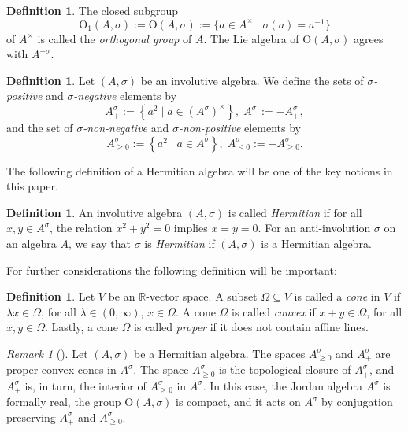 \documentclass[oneside,11pt]{amsart}
\theoremstyle{definition}
\newtheorem{defn}[thm]{Definition}
\theoremstyle{remark}
\newtheorem{rem}[thm]{Remark}
\numberwithin{thm}{section}
\numberwithin{equation}{section}
\begin{document}
\begin{defn}
The closed subgroup 
$$\mathrm{O}_1{(A,\sigma)}:=\mathrm{O}{(A,\sigma)}:=\{a\in A^\times\mid \sigma(a)=a^{-1}\}$$
of $A^\times$ is called the \emph{orthogonal group} of $A$. The Lie algebra of $\mathrm{O}{(A,\sigma)}$ agrees with $A^{-\sigma}$.
\end{defn}

\begin{defn}
\label{df:cone}
Let $(A,\sigma)$ be an involutive algebra. We define the sets of \emph{$\sigma$-positive} and  \emph{$\sigma$-negative} elements by
$$A^\sigma_+:=\left\{ a^2  \mid a\in (A^\sigma)^\times\right\},\;A^\sigma_-:=-A^\sigma_+,$$
and the set of \emph{$\sigma$-non-negative} and \emph{$\sigma$-non-positive} elements by
$$A^\sigma_{\geq 0}:=\left\{ a^2 \mid a\in A^\sigma\right\},\;A^\sigma_{\leq 0}:=-A^\sigma_{\geq 0}.$$
\end{defn}

The following definition of a Hermitian algebra will be one of the key notions in this paper.

\begin{defn}\label{Herm_A}
An involutive algebra $(A,\sigma)$ is called \emph{Hermitian} if for all $x,y\in A^\sigma$, the relation $x^2+y^2=0$ implies $x=y=0$. For an anti-involution $\sigma$ on an algebra $A$, we say that $\sigma$ is \emph{Hermitian} if $(A,\sigma)$ is a Hermitian algebra. 
\end{defn}

For further considerations the following definition will be important:
\begin{defn}
Let $V$ be an $\mathbb{R}$-vector space. A subset $\Omega\subseteq V$ is called a \emph{cone} in $V$ if $\lambda x\in \Omega$, for all $\lambda\in (0,\infty)$, $x\in\Omega$. A cone $\Omega$ is called \emph{convex} if $x+y\in\Omega$, for all $x,y\in\Omega$. Lastly, a cone $\Omega$ is called \emph{proper} if it does not contain affine lines.
\end{defn}

\begin{rem}[{\cite[Section~2]{ABRRW}}]
Let $(A,\sigma)$ be a Hermitian algebra. The spaces $A^\sigma_{\geq 0}$ and $A^\sigma_+$ are proper convex cones in $A^\sigma$. The space $A^\sigma_{\geq 0}$ is the topological closure of $A^\sigma_+$, and $A^\sigma_+$ is, in turn, the interior of $A^\sigma_{\geq 0}$ in $A^\sigma$. In this case, the Jordan algebra $A^\sigma$ is formally real,  the group $\mathrm{O}{(A,\sigma)}$ is compact, and it acts on $A^\sigma$ by conjugation preserving $A^\sigma_+$ and $A^\sigma_{\geq 0}$.
\end{rem}
\end{document}
